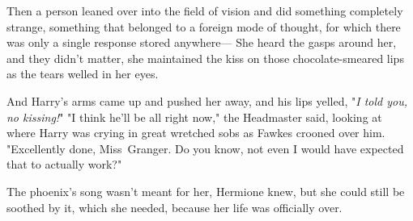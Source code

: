 Then a person leaned over into the field of vision and did something completely
strange, something that belonged to a foreign mode of thought, for which there
was only a single response stored anywhere—
\later
She heard the gasps around her, and they didn’t matter, she maintained the kiss
on those chocolate-smeared lips as the tears welled in her eyes.

And Harry’s arms came up and pushed her away, and his lips yelled, "\emph{I
told you, no kissing!}"
\later
"I think he’ll be all right now," the Headmaster said, looking at where Harry
was crying in great wretched sobs as Fawkes crooned over him. "Excellently
done, Miss~Granger. Do you know, not even I would have expected that to
actually work?"

The phoenix’s song wasn’t meant for her, Hermione knew, but she could still be
soothed by it, which she needed, because her life was officially over.
